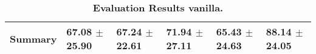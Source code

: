\begin{table}[htb]
{\begin{tabular}{llllll}
\midrule
\textbf{Summary                                  } &                  \phantom{0}67.08 $\pm$ 25.90 &                      \phantom{0}67.24 $\pm$ 22.61 &                  \phantom{0}71.94 $\pm$ 27.11 &                  \phantom{0}65.43 $\pm$ 24.63 &            \phantom{0}88.14 $\pm$ 24.05 \\
\bottomrule
\end{tabular}%
}
\caption{\textbf{Evaluation Results vanilla.}}
\label{tab:eval-results}
\end{table}


